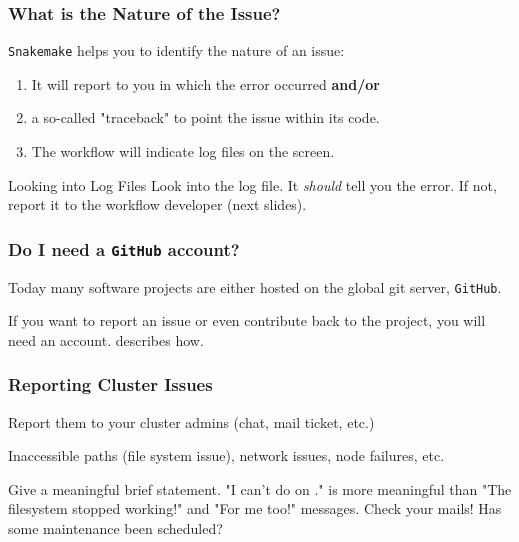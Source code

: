 \begin{frame}
  \frametitle{What is the Nature of the Issue?}
  \texttt{Snakemake} helps you to identify the nature of an issue:
  \begin{enumerate}[<+->]
  	\item It will report to you in which  the error occurred \textbf{and/or}
  	\item a so-called "traceback" to point the issue within its code.
  	\item The workflow will indicate log files on the screen.
  \end{enumerate}
  \pause
  \begin{docs}{Looking into Log Files}
  	Look into the log file. It \textit{should} tell you the error. \pause If not, report it to the workflow developer (next slides). 
  \end{docs}
\end{frame}

\begin{frame}
  \frametitle{Do I need a \texttt{GitHub} account?}
  Today many software projects are either hosted on the global git server, \texttt{GitHub}.
  \begin{docs}
  	If you want to report an issue or even contribute back to the project, you will need an account.  describes how. 
  \end{docs}
  
\end{frame}

\begin{frame}
	\frametitle{Reporting Cluster Issues}
	\begin{question}[Where to?]
	  Report them to your cluster admins (chat, mail ticket, etc.)
	\end{question}
    \pause
    \begin{question}[What?]
      Inaccessible paths (file system issue), network issues, node failures, etc. 
    \end{question}
    \pause
    \begin{question}[How?]
      Give a meaningful brief statement. "I can't do  on ." is more meaningful than "The filesystem stopped working!" and "For me too!" messages.\newline
      \bcattention Check your mails! Has some maintenance been scheduled?
    \end{question}	
\end{frame}

